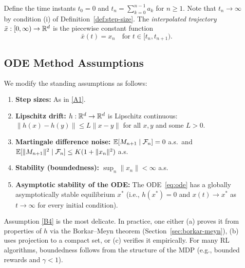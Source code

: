 \documentclass[11pt,a4paper]{article}
\begin{document}
\begin{definition}
\label{def:interpolated-traj}
Define the time instants $t_0 = 0$ and
$t_n = \sum_{k=0}^{n-1} a_k$ for $n \geq 1$. Note that $t_n \to
\infty$ by condition (i) of Definition~\ref{def:step-size}. The
\emph{interpolated trajectory} $\bar{x} : [0,\infty) \to \mathbb{R}^d$ is
the piecewise constant function
\[
  \bar{x}(t) = x_n \quad \text{for } t \in [t_n, t_{n+1}).
\]
\end{definition}

\subsection{ODE Method Assumptions}

\begin{definition}
\label{def:ode-assumptions}
We modify the standing assumptions as follows:
\begin{enumerate}[label=(B\arabic*)]
  \item \label{B1} \textbf{Step sizes:} As in \ref{A1}.
  \item \label{B2} \textbf{Lipschitz drift:} $h : \mathbb{R}^d \to \mathbb{R}^d$ is
    Lipschitz continuous:
    $\|h(x) - h(y)\| \leq L\|x-y\|$ for all $x,y$ and some $L > 0$.
  \item \label{B3} \textbf{Martingale difference noise:}
    $\mathbb{E}[M_{n+1} \mid \mathcal{F}_n] = 0$ a.s.\ and
    $\mathbb{E}[\|M_{n+1}\|^2 \mid \mathcal{F}_n] \leq K(1+\|x_n\|^2)$ a.s.
  \item \label{B4} \textbf{Stability (boundedness):}
    $\sup_n \|x_n\| < \infty$ a.s.
  \item \label{B5} \textbf{Asymptotic stability of the ODE:} The
    ODE~\eqref{eq:ode} has a globally asymptotically stable
    equilibrium $x^*$ (i.e., $h(x^*) = 0$ and $x(t) \to x^*$ as
    $t \to \infty$ for every initial condition).
\end{enumerate}
\end{definition}

\begin{remark}
\label{rem:stability}
Assumption \ref{B4} is the most delicate. In practice, one either
(a) proves it from properties of $h$ via the Borkar--Meyn theorem
(Section~\ref{sec:borkar-meyn}), (b) uses projection to a compact
set, or (c) verifies it empirically. For many RL algorithms,
boundedness follows from the structure of the MDP (e.g., bounded
rewards and $\gamma < 1$).
\end{remark}
\end{document}
